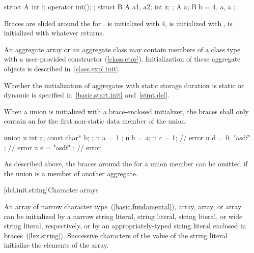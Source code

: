 \enterexample

\begin{codeblock}
struct A {
  int i;
  operator int();
};
struct B {
  A a1, a2;
  int z;
};
A a;
B b = { 4, a, a };
\end{codeblock}

Braces are elided around the
for
.
is initialized with 4,
is initialized with
,
is initialized with whatever
returns.
\exitexample

\pnum
{}%
\enternote
An aggregate array or an aggregate class may contain members of a
class type with a user-provided constructor (\ref{class.ctor}).
Initialization of these aggregate objects is described in~\ref{class.expl.init}.
\exitnote

\pnum
\enternote Whether the initialization of aggregates with static storage duration is static or dynamic is specified in~\ref{basic.start.init} and~\ref{stmt.dcl}. \exitnote

\pnum
{}%
When a union is initialized with a brace-enclosed initializer,
the braces shall only contain an
for the first non-static data member of the union.
\enterexample

\begin{codeblock}
union u { int a; const char* b; };
u a = { 1 };
u b = a;
u c = 1;                        // error
u d = { 0, "asdf" };            // error
u e = { "asdf" };               // error
\end{codeblock}
\exitexample

\pnum
\enternote
As described above,
the braces around the
for a union member can be omitted if the
union is a member of another aggregate.
\exitnote

[dcl.init.string]{Character arrays}%

\pnum
An array of narrow character type~(\ref{basic.fundamental}),
 array,
 array,
or  array
can be initialized by a
narrow string literal,  string literal,  string
literal, or wide string literal,
respectively, or by an appropriately-typed string literal enclosed in
braces~(\ref{lex.string}).
%
Successive
characters of the
value of the string literal
initialize the elements of the array.
\enterexample

